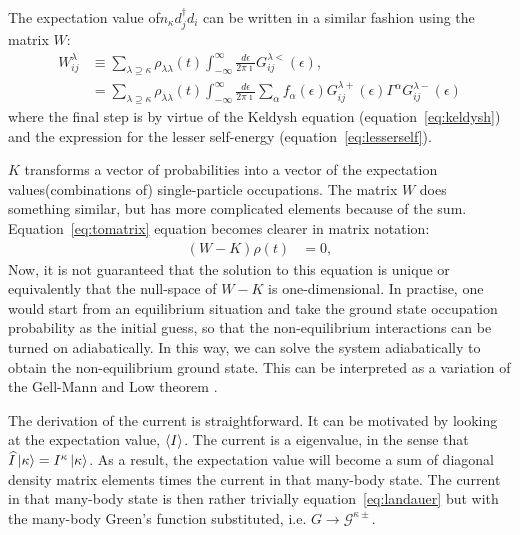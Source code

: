 The expectation value of$n_\kappa d_j^\dagger d_i$ can be written in a similar fashion using the matrix $W$:
\begin{align*}
W^\lambda_{ij} &\equiv \sum_{\lambda\supseteq \kappa} \rho_{\lambda\lambda}(t) \int^\infty_{-\infty} \frac{d\epsilon}{2\pi\imath} G^{\lambda<}_{ij}(\epsilon), \\
&= \sum_{\lambda\supseteq \kappa} \rho_{\lambda\lambda}(t) \int^\infty_{-\infty} \frac{d\epsilon}{2\pi\imath} \sum_\alpha f_\alpha(\epsilon) G^{\lambda+}_{ij}(\epsilon) \Gamma^\alpha G^{\lambda-}_{ij}(\epsilon)
\end{align*} where the final step is by virtue of the Keldysh equation (equation~\ref{eq:keldysh}) and the expression for the lesser self-energy (equation~\ref{eq:lesserself}).

$K$ transforms a vector of probabilities into a vector of the expectation values(combinations of) single-particle occupations. The matrix $W$ does something similar, but has more complicated elements because of the sum. Equation~\ref{eq:tomatrix} equation becomes clearer in matrix notation:
\begin{align*}
    \left(W-K\right) \rho(t) &= 0,
\end{align*}
Now, it is not guaranteed that the solution to this equation is unique or equivalently that the null-space of $W-K$ is one-dimensional. In practise, one would start from an equilibrium situation and take the ground state occupation probability as the initial guess, so that the non-equilibrium interactions can be turned on adiabatically. In this way, we can solve the system adiabatically to obtain the non-equilibrium ground state. This can be interpreted as a variation of the Gell-Mann and Low theorem \cite{gellmannlow, molinari}.


The derivation of the current is straightforward. It can be motivated by looking at the expectation value,  $\braket{I}$. The current is a eigenvalue, in the sense that $ \widehat{I} \ket{\kappa} = I^\kappa \ket{\kappa}$. As a result, the expectation value will become a sum of diagonal density matrix elements times the current in that many-body state. The current in that many-body state is then rather trivially equation~\ref{eq:landauer} but with the many-body Green's function substituted, i.e. $G \rightarrow \mathscr{G}^{\kappa\pm}$.

